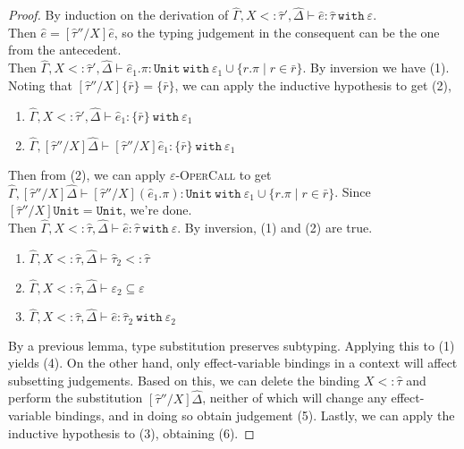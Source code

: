 \documentclass{llncs}
\newcommand{\keywadj}[1]{\mathtt{#1}}
\newcommand{\keyw}[1]{\keywadj{#1}~}
\newcommand{\kw}[1]{\keyw{ #1 }}
\newcommand{\kwa}[1]{\keywadj{ #1 }}
\newcommand{\Unit}[0]{ \kwa{Unit} }
\begin{document}
\begin{proof} By induction on the derivation of $\hat \Gamma, X <: \hat \tau', \hat \Delta \vdash \hat e: \hat \tau~\kw{with} \varepsilon$.\\

 Then $\hat e = [\hat \tau''/X]\hat e$, so the typing judgement in the consequent can be the one from the antecedent.\\

 Then $\hat \Gamma, X <: \hat \tau', \hat \Delta \vdash \hat e_1.\pi : \Unit~\kw{with} \varepsilon_1 \cup \{ r.\pi \mid r \in \bar r \}$. By inversion we have (1). Noting that $[\hat \tau''/X]\{ \bar r \} = \{ \bar r \}$, we can apply the inductive hypothesis to get (2),

\begin{enumerate}
	\item $\hat \Gamma, X <: \hat \tau', \hat \Delta \vdash \hat e_1: \{ \bar r \}~\kw{with} \varepsilon_1$
	\item $\hat \Gamma, [\hat \tau''/X]\hat \Delta \vdash [\hat \tau''/X]\hat e_1: \{ \bar r \}~\kw{with} \varepsilon_1$
\end{enumerate}

Then from (2), we can apply \textsc{$\varepsilon$-OperCall} to get $\hat \Gamma, [\hat \tau''/X]\hat \Delta \vdash [\hat \tau''/X](\hat e_1.\pi): \Unit~\kw{with} \varepsilon_1 \cup \{ r.\pi \mid r \in \bar r \}$. Since $[\hat \tau''/X]\Unit = \Unit$, we're done.\\

 Then $\hat \Gamma, X <: \hat \tau, \hat \Delta \vdash \hat e: \hat \tau~\kw{with} \varepsilon$. By inversion, (1) and (2) are true.

\begin{enumerate}
	\item $\hat \Gamma, X <: \hat \tau, \hat \Delta \vdash \hat \tau_2 <: \hat \tau$
	\item $\hat \Gamma, X <: \hat \tau, \hat \Delta \vdash \varepsilon_2 \subseteq \varepsilon$
	\item $\hat \Gamma, X <: \hat \tau, \hat \Delta \vdash \hat e: \hat \tau_2~\kw{with} \varepsilon_2$
\end{enumerate}

By a previous lemma, type substitution preserves subtyping. Applying this to (1) yields (4). On the other hand, only effect-variable bindings in a context will affect subsetting judgements. Based on this, we can delete the binding $X <: \hat \tau$ and perform the substitution $[\hat \tau''/X]\hat \Delta$, neither of which will change any effect-variable bindings, and in doing so obtain judgement (5). Lastly, we can apply the inductive hypothesis to (3), obtaining (6).


\end{proof}
\end{document}
